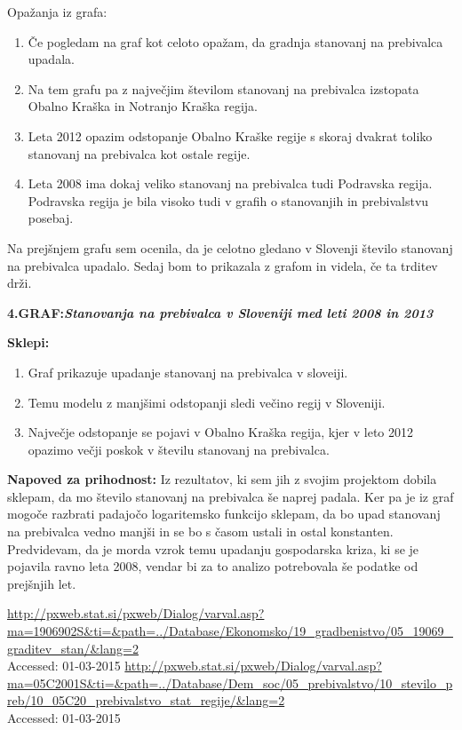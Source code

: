 \documentclass[11pt,a4paper]{article}
\begin{document}
\newpage
Opažanja iz grafa:
\begin{enumerate}
\item{Če pogledam na graf kot celoto opažam, da gradnja stanovanj na prebivalca upadala.}
\item{Na tem grafu pa z največjim številom stanovanj na prebivalca izstopata Obalno Kraška in Notranjo Kraška regija.}
\item{Leta 2012 opazim odstopanje Obalno Kraške regije s skoraj dvakrat toliko stanovanj na prebivalca kot ostale regije.}
\item{Leta 2008 ima dokaj veliko stanovanj na prebivalca tudi Podravska regija. Podravska regija je bila visoko tudi v grafih o stanovanjih in prebivalstvu posebaj.}
\end{enumerate}

\newpage
Na prejšnjem grafu sem ocenila, da je celotno gledano v Slovenji število stanovanj na prebivalca upadalo. Sedaj bom to prikazala z grafom in videla, če ta trditev drži.
\newline

\textbf{4.GRAF:\emph{Stanovanja na prebivalca v Sloveniji med leti 2008 in 2013}}\\
\newline
{}

\newpage
\textbf{Sklepi:}
\begin{enumerate}
\item{Graf prikazuje upadanje stanovanj na prebivalca v sloveiji.}
\item{Temu modelu z manjšimi odstopanji sledi večino regij v Sloveniji.}
\item{Največje odstopanje se pojavi v Obalno Kraška regija, kjer v leto 2012 opazimo večji poskok v številu stanovanj na prebivalca.}
\end{enumerate}

\textbf{Napoved za prihodnost:}\newline
Iz rezultatov, ki sem jih z svojim projektom dobila sklepam, da mo število stanovanj na prebivalca še naprej padala. Ker pa je iz graf mogoče razbrati padajočo logaritemsko funkcijo sklepam, da bo upad stanovanj na prebivalca vedno manjši in se bo s časom ustali in ostal konstanten. Predvidevam, da je morda vzrok temu upadanju gospodarska kriza, ki se je pojavila ravno leta 2008, vendar bi za to analizo potrebovala še podatke od prejšnjih let. 

\newpage
\begin{thebibliography}{9}
  \url{http://pxweb.stat.si/pxweb/Dialog/varval.asp?ma=1906902S&ti=&path=../Database/Ekonomsko/19_gradbenistvo/05_19069_graditev_stan/&lang=2}\\
  {Accessed: 01-03-2015}
  \url{http://pxweb.stat.si/pxweb/Dialog/varval.asp?ma=05C2001S&ti=&path=../Database/Dem_soc/05_prebivalstvo/10_stevilo_preb/10_05C20_prebivalstvo_stat_regije/&lang=2}\\
  {Accessed: 01-03-2015}
\end{thebibliography}
\end{document}
